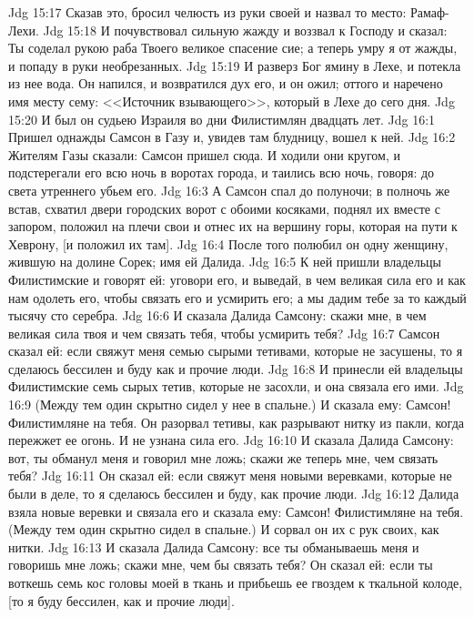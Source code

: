 \vs Jdg 15:17 Сказав это, бросил челюсть из руки своей и назвал то место: Рамаф-Лехи.
\vs Jdg 15:18 И почувствовал сильную жажду и воззвал к Господу и сказал: Ты соделал рукою раба Твоего великое спасение сие; а теперь умру я от жажды, и попаду в руки необрезанных.
\vs Jdg 15:19 И разверз Бог ямину в Лехе, и потекла из нее вода. Он напился, и возвратился дух его, и он ожил; оттого и наречено имя месту сему: <<Источник взывающего>>, который в Лехе до сего дня.
\vs Jdg 15:20 И был он судьею Израиля во дни Филистимлян двадцать лет.
\vs Jdg 16:1 Пришел однажды Самсон в Газу и, увидев там блудницу, вошел к ней.
\vs Jdg 16:2 Жителям Газы сказали: Самсон пришел сюда. И ходили они кругом, и подстерегали его всю ночь в воротах города, и таились всю ночь, говоря: до света утреннего  убьем его.
\vs Jdg 16:3 А Самсон спал до полуночи; в полночь же встав, схватил двери городских ворот с обоими косяками, поднял их вместе с запором, положил на плечи свои и отнес их на вершину горы, которая на пути к Хеврону, [и положил их там].
\vs Jdg 16:4 После того полюбил он одну женщину, жившую на долине Сорек; имя ей Далида.
\vs Jdg 16:5 К ней пришли владельцы Филистимские и говорят ей: уговори его, и выведай, в чем великая сила его и как нам одолеть его, чтобы связать его и усмирить его; а мы дадим тебе за то каждый тысячу сто  серебра.
\vs Jdg 16:6 И сказала Далида Самсону: скажи мне, в чем великая сила твоя и чем связать тебя, чтобы усмирить тебя?
\vs Jdg 16:7 Самсон сказал ей: если свяжут меня семью сырыми тетивами, которые не засушены, то я сделаюсь бессилен и буду как и прочие люди.
\vs Jdg 16:8 И принесли ей владельцы Филистимские семь сырых тетив, которые не засохли, и она связала его ими.
\vs Jdg 16:9 (Между тем один скрытно сидел у нее в спальне.) И сказала ему: Самсон! Филистимляне  на тебя. Он разорвал тетивы, как разрывают нитку из пакли, когда пережжет ее огонь. И не узнана сила его.
\vs Jdg 16:10 И сказала Далида Самсону: вот, ты обманул меня и говорил мне ложь; скажи же теперь мне, чем связать тебя?
\vs Jdg 16:11 Он сказал ей: если свяжут меня новыми веревками, которые не были в деле, то я сделаюсь бессилен и буду, как прочие люди.
\vs Jdg 16:12 Далида взяла новые веревки и связала его и сказала ему: Самсон! Филистимляне  на тебя. (Между тем один скрытно сидел в спальне.) И сорвал он их с рук своих, как нитки.
\vs Jdg 16:13 И сказала Далида Самсону: все ты обманываешь меня и говоришь мне ложь; скажи мне, чем бы связать тебя? Он сказал ей: если ты воткешь семь кос головы моей в ткань и прибьешь ее гвоздем к ткальной колоде, [то я буду бессилен, как и прочие люди].
